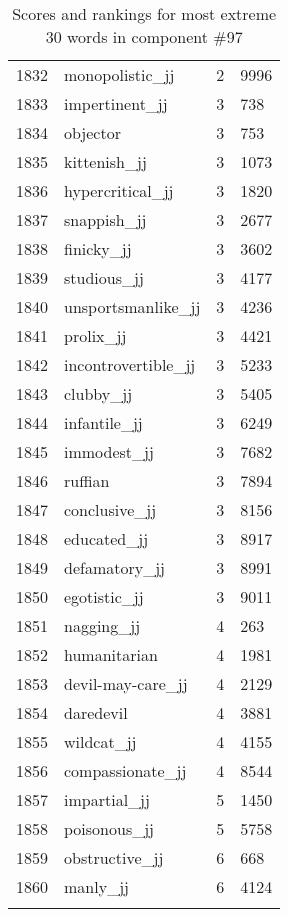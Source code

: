 \begin{longtable}[!htbp]{| rlr@{.}l |}
    1832 & monopolistic\_jj & 2 & 9996 \\
    1833 & impertinent\_jj & 3 & 738 \\
    1834 & objector & 3 & 753 \\
    1835 & kittenish\_jj & 3 & 1073 \\
    1836 & hypercritical\_jj & 3 & 1820 \\
    1837 & snappish\_jj & 3 & 2677 \\
    1838 & finicky\_jj & 3 & 3602 \\
    1839 & studious\_jj & 3 & 4177 \\
    1840 & unsportsmanlike\_jj & 3 & 4236 \\
    1841 & prolix\_jj & 3 & 4421 \\
    1842 & incontrovertible\_jj & 3 & 5233 \\
    1843 & clubby\_jj & 3 & 5405 \\
    1844 & infantile\_jj & 3 & 6249 \\
    1845 & immodest\_jj & 3 & 7682 \\
    1846 & ruffian & 3 & 7894 \\
    1847 & conclusive\_jj & 3 & 8156 \\
    1848 & educated\_jj & 3 & 8917 \\
    1849 & defamatory\_jj & 3 & 8991 \\
    1850 & egotistic\_jj & 3 & 9011 \\
    1851 & nagging\_jj & 4 & 263 \\
    1852 & humanitarian & 4 & 1981 \\
    1853 & devil-may-care\_jj & 4 & 2129 \\
    1854 & daredevil & 4 & 3881 \\
    1855 & wildcat\_jj & 4 & 4155 \\
    1856 & compassionate\_jj & 4 & 8544 \\
    1857 & impartial\_jj & 5 & 1450 \\
    1858 & poisonous\_jj & 5 & 5758 \\
    1859 & obstructive\_jj & 6 & 668 \\
    1860 & manly\_jj & 6 & 4124 \\
    \hline
    \caption{Scores and rankings for most extreme 30 words in component \#97} \\
\end{longtable}

